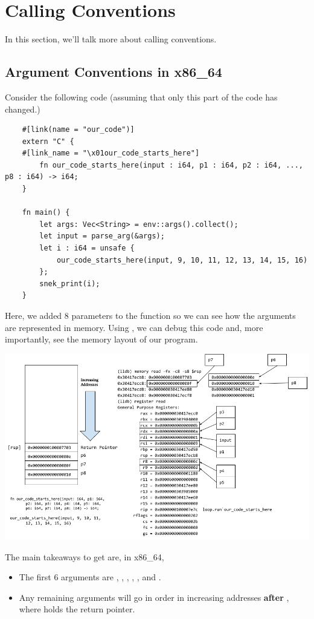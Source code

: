 \section{Calling Conventions}
In this section, we'll talk more about calling conventions. 

\subsection{Argument Conventions in x86\_64}
Consider the following code (assuming that only this part of the code has changed.)
\begin{verbatim}
    #[link(name = "our_code")]
    extern "C" {
    #[link_name = "\x01our_code_starts_here"]
        fn our_code_starts_here(input : i64, p1 : i64, p2 : i64, ..., p8 : i64) -> i64;
    }

    fn main() {
        let args: Vec<String> = env::args().collect();
        let input = parse_arg(&args);
        let i : i64 = unsafe { 
            our_code_starts_here(input, 9, 10, 11, 12, 13, 14, 15, 16) 
        };
        snek_print(i);
    }\end{verbatim}
Here, we added 8 parameters to the  function so we can see how the arguments are represented in memory. Using , we can debug this code and, more importantly, see the memory layout of our program.
\begin{center}
    \includegraphics[scale=0.5]{assets/mem_layout.png}
\end{center}
The main takeaways to get are, in x86\_64,
\begin{itemize}
    \item The first 6 arguments are , , , , , and .
    \item Any remaining arguments will go in order in increasing addresses \textbf{after} \code{[rsp]}, where \code{[rsp]} holds the return pointer.
\end{itemize}

